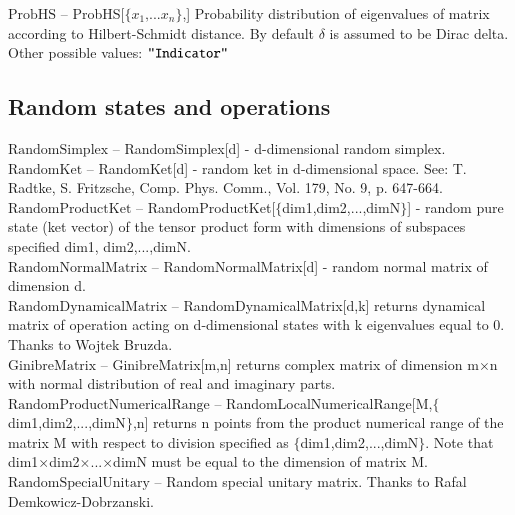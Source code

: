 \noindent\textbf{$ \text{ProbHS} $ }-- ProbHS[$\{$$ x_1\text{,...}x_n $$\}$,] Probability distribution of eigenvalues of matrix according to Hilbert-Schmidt distance. By default $\delta $ is assumed to be Dirac delta. Other possible values: $\texttt{"$ $Indicator$\texttt{"}$} $\\[6pt]

\subsection{Random states and operations}

\noindent\textbf{$ \text{RandomSimplex} $ }-- RandomSimplex[d] - d-dimensional random simplex.$  $\\[6pt]

\noindent\textbf{$ \text{RandomKet} $ }-- RandomKet[d] - random ket in d-dimensional space. See: T. Radtke, S. Fritzsche, Comp. Phys. Comm., Vol. 179, No. 9, p. 647-664.$  $\\[6pt]

\noindent\textbf{$ \text{RandomProductKet} $ }-- RandomProductKet[$\{$dim1,dim2,...,dimN$\}$] - random pure state (ket vector) of the tensor product form with dimensions of subspaces specified dim1, dim2,...,dimN.$  $\\[6pt]

\noindent\textbf{$ \text{RandomNormalMatrix} $ }-- RandomNormalMatrix[d] - random normal matrix of dimension d.$  $\\[6pt]

\noindent\textbf{$ \text{RandomDynamicalMatrix} $ }-- RandomDynamicalMatrix[d,k] returns dynamical matrix of operation acting on d-dimensional states with k eigenvalues equal to 0. Thanks to Wojtek Bruzda.$  $\\[6pt]

\noindent\textbf{$ \text{GinibreMatrix} $ }-- GinibreMatrix[m,n] returns complex matrix of dimension m$\times $n with normal distribution of real and imaginary parts.$  $\\[6pt]

\noindent\textbf{$ \text{RandomProductNumericalRange} $ }-- RandomLocalNumericalRange[M,$\{$dim1,dim2,...,dimN$\}$,n] returns n points from the product numerical range of the matrix M with respect to division specified as $\{$dim1,dim2,...,dimN$\}$. Note that dim1$\times $dim2$\times $...$\times $dimN must be equal to the dimension of matrix M.$  $\\[6pt]

\noindent\textbf{$ \text{RandomSpecialUnitary} $ }-- Random special unitary matrix. Thanks to Rafal Demkowicz-Dobrzanski.$  $\\[6pt]


